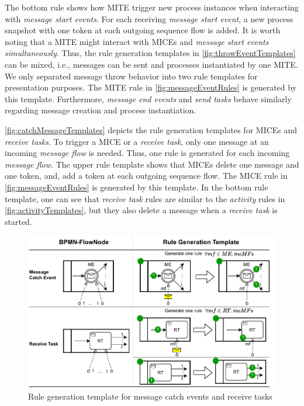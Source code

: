 \documentclass[submission, copyright, creativecommons]{eptcs}
\begin{document}
The bottom rule shows how MITE trigger new process instances when interacting with \textit{message start events}.
For each receiving \textit{message start event}, a new process snapshot with one token at each outgoing sequence flow is added.
It is worth noting that a MITE might interact with MICEs and \textit{message start events} \textit{simultaneously}.
Thus, the rule generation templates in \cref{fig:throwEventTemplates} can be mixed, i.e., messages can be sent and processes instantiated by one MITE.
We only separated message throw behavior into two rule templates for presentation purposes.
The MITE rule in \cref{fig:messageEventRules} is generated by this template.
Furthermore, \textit{message end events} and \textit{send tasks} behave similarly regarding message creation and process instantiation.

\autoref{fig:catchMessageTemplates} depicts the rule generation templates for MICEs and \textit{receive tasks}.
To trigger a MICE or a \textit{receive task}, only one message at an incoming \textit{message flow} is needed.
Thus, one rule is generated for each incoming \textit{message flow}.
The upper rule template shows that MICEs delete one message and one token, and, add a token at each outgoing sequence flow.
The MICE rule in \cref{fig:messageEventRules} is generated by this template.
In the bottom rule template, one can see that \textit{receive task} rules are similar to the \textit{activity} rules in \cref{fig:activityTemplates}, but they also delete a message when a \textit{receive task} is started.

\begin{figure}[h]
    \centering
    \includegraphics[width=1\textwidth]{images/catch_messages.pdf}
    \caption{Rule generation template for message catch events and receive tasks}
    \label{fig:catchMessageTemplates}
\end{figure}
\end{document}
